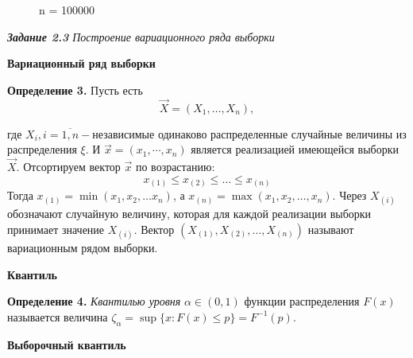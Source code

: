 \documentclass[a4paper,12pt, oneside]{book}
\begin{document}
\begin{figure}[h!]
\begin{center}
\begin{minipage}[h]{0.47\linewidth}
		\end{minipage}
		\hfill
		\begin{minipage}[h]{0.47\linewidth}
			 n = 100000 \\
		\end{minipage}
	\end{center}
\end{figure}

\newpage
{\large\textit{\textbf{Задание 2.3} Построение вариационного ряда выборки}}

\vspace{5mm}
\large{\textbf{Вариационный ряд выборки}}
\vspace{5mm}

\normalsize{\textbf{Определение 3.}} Пусть есть 
$$
\vec{X} = (X_1, \ldots , X_n),
$$

где $X_i, i=\overline{1,n} - $независимые одинаково распределенные случайные величины из распределения $\xi$. И $\vec{x} = (x_1, \cdots, x_n)$ является реализацией
имеющейся выборки $\vec{X}$. Отсортируем вектор $\vec{x}$ по возрастанию:
$$
x_{(1)} \leq x_{(2)} \leq \ldots \leq x_{(n)}
$$
Тогда $x_{(1)} = \min(x_1, x_2, \ldots x_n)$, а $x_{(n)} = \max(x_1, x_2, \ldots, x_n)$. Через $X_{(i)}$ 
обозначают случайную величину, которая для каждой реализации выборки
принимает значение $X_{(i)}$. Вектор $(X_{(1)}, X_{(2)}, \ldots, X_{(n)})$ называют вариационным рядом выборки.

\vspace{5mm}
\large{\textbf{Квантиль}}
\vspace{5mm}

\normalsize{\textbf{Определение 4.}} \textit{Квантилью уровня} $\alpha \in (0, 1)$ функции распределения $F(x)$ называется величина $\zeta_\alpha = \sup\{ x: F(x) \leq p \} = F^{-1}(p)$.

\vspace{5mm}
\large{\textbf{Выборочный квантиль}}
\vspace{5mm}
\end{document}
